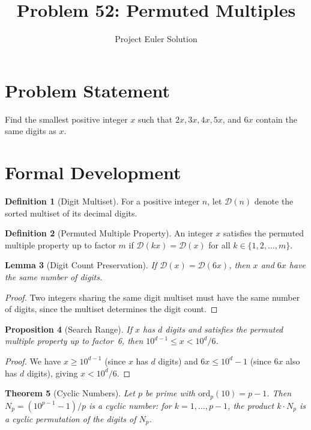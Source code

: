 \documentclass[12pt]{article}
\title{Problem 52: Permuted Multiples}
\author{Project Euler Solution}
\date{}
\newtheorem{theorem}{Theorem}
\newtheorem{lemma}[theorem]{Lemma}
\newtheorem{proposition}[theorem]{Proposition}
\theoremstyle{definition}
\newtheorem{definition}[theorem]{Definition}
\begin{document}
\maketitle

\section{Problem Statement}
Find the smallest positive integer $x$ such that $2x, 3x, 4x, 5x$, and $6x$ contain the same digits as $x$.

\section{Formal Development}

\begin{definition}[Digit Multiset]
For a positive integer $n$, let $\mathcal{D}(n)$ denote the sorted multiset of its decimal digits.
\end{definition}

\begin{definition}[Permuted Multiple Property]
An integer $x$ satisfies the permuted multiple property up to factor $m$ if $\mathcal{D}(kx) = \mathcal{D}(x)$ for all $k \in \{1, 2, \ldots, m\}$.
\end{definition}

\begin{lemma}[Digit Count Preservation]
If $\mathcal{D}(x) = \mathcal{D}(6x)$, then $x$ and $6x$ have the same number of digits.
\end{lemma}

\begin{proof}
Two integers sharing the same digit multiset must have the same number of digits, since the multiset determines the digit count.
\end{proof}

\begin{proposition}[Search Range]
\label{prop:range}
If $x$ has $d$ digits and satisfies the permuted multiple property up to factor~6, then $10^{d-1} \leq x < 10^d / 6$.
\end{proposition}

\begin{proof}
We have $x \geq 10^{d-1}$ (since $x$ has $d$ digits) and $6x \leq 10^d - 1$ (since $6x$ also has $d$ digits), giving $x < 10^d / 6$.
\end{proof}

\begin{theorem}[Cyclic Numbers]
\label{thm:cyclic}
Let $p$ be prime with $\mathrm{ord}_p(10) = p - 1$. Then $N_p = (10^{p-1} - 1)/p$ is a cyclic number: for $k = 1, \ldots, p-1$, the product $k \cdot N_p$ is a cyclic permutation of the digits of $N_p$.
\end{theorem}
\end{document}
